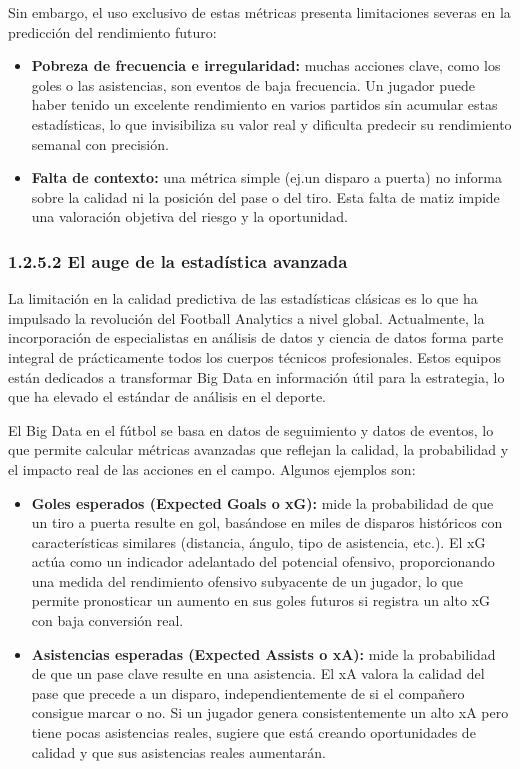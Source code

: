 Sin embargo, el uso exclusivo de estas métricas presenta limitaciones severas en la predicción del 
rendimiento futuro:

\begin{itemize}
\item \textbf{Pobreza de frecuencia e irregularidad:} muchas acciones clave, como los goles o las 
asistencias, son eventos de baja frecuencia.
Un jugador puede haber tenido un excelente rendimiento en varios partidos sin acumular estas 
estadísticas, lo que invisibiliza su valor real y dificulta predecir su rendimiento semanal con 
precisión.
\item \textbf{Falta de contexto:} una métrica simple (ej.\@ un disparo a puerta) no informa sobre la 
calidad ni la posición del pase o del tiro.
Esta falta de matiz impide una valoración objetiva del riesgo y la oportunidad.
\end{itemize}

\subsubsection{1.2.5.2 El auge de la estadística avanzada}

La limitación en la calidad predictiva de las estadísticas clásicas es lo que ha impulsado la 
revolución del Football Analytics a nivel global.
Actualmente, la incorporación de especialistas en análisis de datos y ciencia de datos forma parte 
integral de prácticamente todos los cuerpos técnicos profesionales.
Estos equipos están dedicados a transformar Big Data en información útil para la estrategia, lo que 
ha elevado el estándar de análisis en el deporte.

El Big Data en el fútbol se basa en datos de seguimiento y datos de eventos, lo que permite calcular 
métricas avanzadas que reflejan la calidad, la probabilidad y el impacto real de las acciones en el campo.
Algunos ejemplos son:

\begin{itemize}
\item \textbf{Goles esperados (Expected Goals o xG):} mide la probabilidad de que un tiro a puerta 
resulte en gol, basándose en miles de disparos históricos con características similares (distancia, 
ángulo, tipo de asistencia, etc.).
El xG actúa como un indicador adelantado del potencial ofensivo, proporcionando una medida del 
rendimiento ofensivo subyacente de un jugador, lo que permite pronosticar un aumento en sus goles 
futuros si registra un alto xG con baja conversión real.
\item \textbf{Asistencias esperadas (Expected Assists o xA):} mide la probabilidad de que un pase 
clave resulte en una asistencia.
El xA valora la calidad del pase que precede a un disparo, independientemente de si el compañero 
consigue marcar o no.
Si un jugador genera consistentemente un alto xA pero tiene pocas asistencias reales, sugiere que 
está creando oportunidades de calidad y que sus asistencias reales aumentarán.
\end{itemize}

